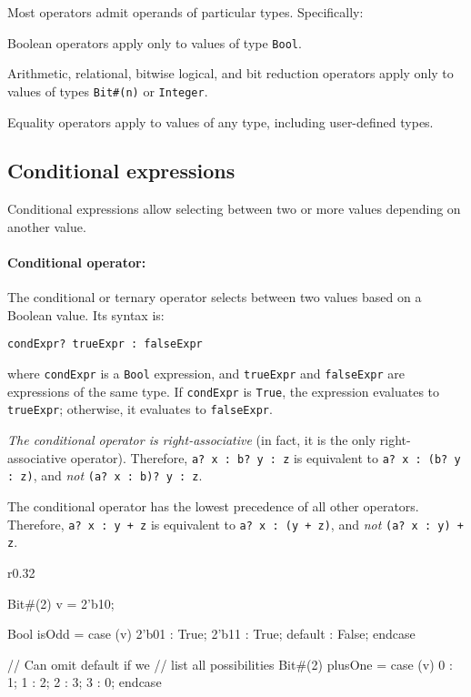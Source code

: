 \smallskip

Most operators admit operands of particular types. Specifically:
\begin{compactitem}
\item Boolean operators apply only to values of type \texttt{Bool}.
\item Arithmetic, relational, bitwise logical, and bit reduction operators
  apply only to values of types \texttt{Bit\#(n)} or \texttt{Integer}.
\item Equality operators apply to values of any type, including user-defined types.
\end{compactitem}

\subsection{Conditional expressions}
\label{sec:condExprs}

Conditional expressions allow selecting between two or more values depending on another value.

\paragraph{Conditional operator:} The conditional or ternary operator selects between two values based on a Boolean value.
Its syntax is: 
\begin{center}
\verb|condExpr? trueExpr : falseExpr|
\end{center}
where \verb|condExpr| is a \verb|Bool| expression, and \verb|trueExpr| and \verb|falseExpr| are expressions of the same type.
If \verb|condExpr| is \verb|True|, the expression evaluates to \verb|trueExpr|; otherwise, it evaluates to \verb|falseExpr|.

\emph{The conditional operator is right-associative} (in fact, it is the only right-associative operator).
Therefore, \verb|a? x : b? y : z| is equivalent to
\verb|a? x : (b? y : z)|, and \emph{not} \verb|(a? x : b)? y : z|.

The conditional operator has the lowest precedence of all other operators.
Therefore, \verb|a? x : y + z| is equivalent to \verb|a? x : (y + z)|,
and \emph{not} \verb|(a? x : y) + z|.

\begin{wrapfigure}{r}{0.32\columnwidth}
\vspace{-2em}
\begin{mscode}
Bit#(2) v = 2'b10;

Bool isOdd = case (v)
  2'b01 : True;
  2'b11 : True;
  default : False;
endcase

// Can omit default if we
// list all possibilities
Bit#(2) plusOne = case (v)
  0 : 1;
  1 : 2;
  2 : 3;
  3 : 0;
endcase
\end{mscode}
\vspace{-2em}
\end{wrapfigure}

